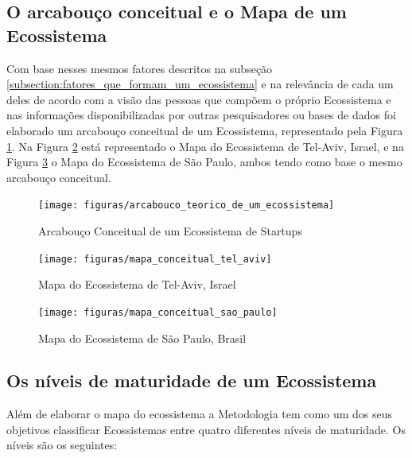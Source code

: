 \subsection{O arcabouço conceitual e o Mapa de um Ecossistema}
\label{subsection:arcabouco_conceitual_e_modelo}

Com base nesses mesmos fatores descritos na subseção \ref{subsection:fatores_que_formam_um_ecossistema} e na relevância de cada um deles de acordo com a visão das pessoas que compõem o próprio Ecossistema e nas informações disponibilizadas por outras pesquisadores ou bases de dados foi elaborado um arcabouço conceitual de um Ecossistema, representado pela Figura \ref{figure:arcabouco_teorico_de_um_ecossistema}. Na Figura \ref{figure:mapa_conceitual_tel_aviv} está representado o Mapa do Ecossistema de Tel-Aviv, Israel, e na Figura \ref{figure:mapa_conceitual_sao_paulo} o Mapa do Ecossistema de São Paulo, ambos tendo como base o mesmo arcabouço conceitual.

\begin{figure}[!htb]
\centering
\texttt{[image: figuras/arcabouco\_teorico\_de\_um\_ecossistema]}
\caption{Arcabouço Conceitual de um Ecossistema de Startups}
\label{figure:arcabouco_teorico_de_um_ecossistema}
\end{figure}

\begin{figure}[!htbp]
\centering
\texttt{[image: figuras/mapa\_conceitual\_tel\_aviv]}
\caption{Mapa do Ecossistema de Tel-Aviv, Israel}
\label{figure:mapa_conceitual_tel_aviv}
\end{figure}

\begin{figure}[!htbp]
\centering
\texttt{[image: figuras/mapa\_conceitual\_sao\_paulo]}
\caption{Mapa do Ecossistema de São Paulo, Brasil}
\label{figure:mapa_conceitual_sao_paulo}
\end{figure}

\subsection{Os níveis de maturidade de um Ecossistema}
\label{subsection:niveis_de_maturidade_de_um_ecossistema}

Além de elaborar o mapa do ecossistema a Metodologia tem como um dos seus objetivos classificar Ecossistemas entre quatro diferentes níveis de maturidade. Os níveis são os seguintes:

